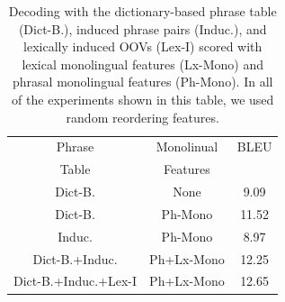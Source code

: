 \documentclass[11pt]{article}
\begin{document}
\begin{table}
\small
\begin{center}
\begin{tabular}{|c|c|c|}
\hline
Phrase 	& Monolinual  & 	BLEU \\
Table	& Features &  \\
\hline
Dict-B. & None & 9.09 \\
Dict-B. & Ph-Mono & 11.52 \\
Induc. & Ph-Mono &  8.97 \\
Dict-B.+Induc. & Ph+Lx-Mono & 12.25 \\
Dict-B.+Induc.+Lex-I & Ph+Lx-Mono & 12.65 \\
\hline
\end{tabular}
\caption{Decoding with the dictionary-based phrase table (Dict-B.), induced phrase pairs (Induc.), and lexically induced OOVs (Lex-I) scored with lexical monolingual features (Lx-Mono) and phrasal monolingual features (Ph-Mono). In all of the experiments shown in this table, we used random reordering features.}\label{table:new-phrase-tables}
\end{center}
\end{table}





\end{document}

